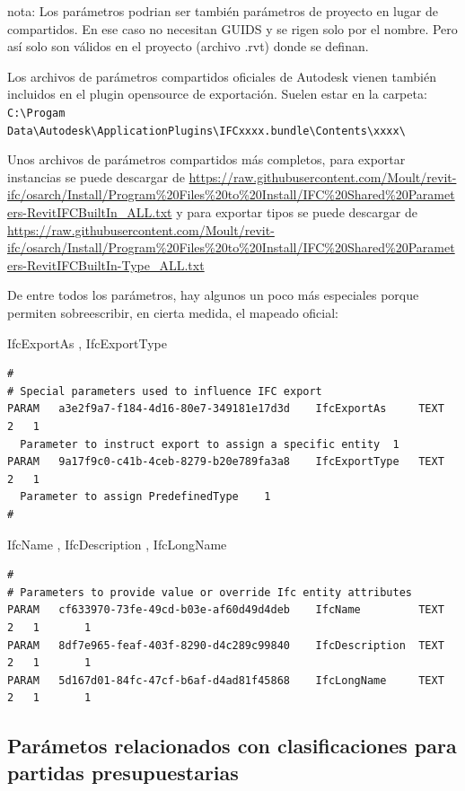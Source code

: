 \documentclass[spanish,12pt,a4paper,final,oneside]{book}
\begin{document}
\begin{footnotesize}nota: Los parámetros podrian ser también parámetros de proyecto en lugar de compartidos. En ese caso no necesitan GUIDS y se rigen solo por el nombre. Pero así solo son válidos en el proyecto (archivo .rvt) donde se definan.\end{footnotesize}

Los archivos de parámetros compartidos oficiales de Autodesk vienen también incluidos en el plugin opensource de exportación. Suelen estar en la carpeta:
\\ \verb!C:\Progam Data\Autodesk\ApplicationPlugins\IFCxxxx.bundle\Contents\xxxx\!

Unos archivos de parámetros compartidos más completos, para exportar instancias se puede descargar de \url{https://raw.githubusercontent.com/Moult/revit-ifc/osarch/Install/Program%20Files%20to%20Install/IFC%20Shared%20Parameters-RevitIFCBuiltIn_ALL.txt} y para exportar tipos se puede descargar de \url{https://raw.githubusercontent.com/Moult/revit-ifc/osarch/Install/Program%20Files%20to%20Install/IFC%20Shared%20Parameters-RevitIFCBuiltIn-Type_ALL.txt}

De entre todos los parámetros, hay algunos un poco más especiales porque permiten sobreescribir, en cierta medida, el mapeado oficial:

IfcExportAs , IfcExportType
\begin{verbatim}
#
# Special parameters used to influence IFC export
PARAM	a3e2f9a7-f184-4d16-80e7-349181e17d3d	IfcExportAs		TEXT	2	1	
  Parameter to instruct export to assign a specific entity	1
PARAM	9a17f9c0-c41b-4ceb-8279-b20e789fa3a8	IfcExportType	TEXT	2	1	
  Parameter to assign PredefinedType	1
#
\end{verbatim} 
IfcName , IfcDescription , IfcLongName
\begin{verbatim}
#
# Parameters to provide value or override Ifc entity attributes
PARAM	cf633970-73fe-49cd-b03e-af60d49d4deb	IfcName			TEXT		2	1		1
PARAM	8df7e965-feaf-403f-8290-d4c289c99840	IfcDescription	TEXT		2	1		1
PARAM	5d167d01-84fc-47cf-b6af-d4ad81f45868	IfcLongName		TEXT		2	1		1
\end{verbatim}


\subsection{Parámetos relacionados con clasificaciones para partidas presupuestarias} \label{clasificaciones_para_partidas_presupuestarias}
\end{document}
